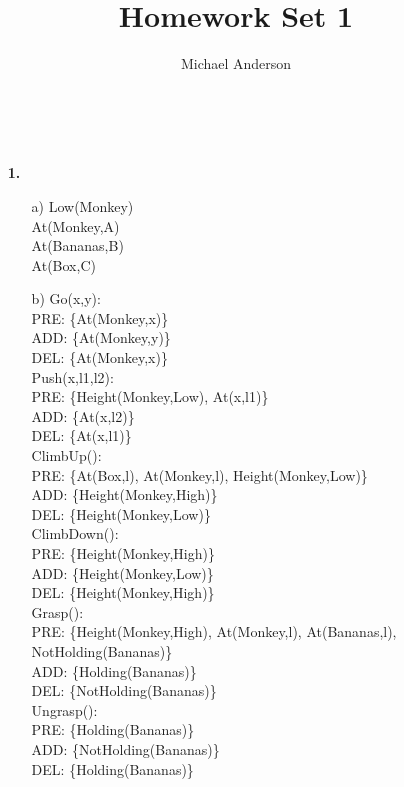 \documentclass{article}
\author{Michael Anderson}
\title{Homework Set 1}
\begin{document}
\maketitle
{}
\\
\flushleft
\newpage

\begin{enumerate}
\item[\textbf{1.}]

\begin{enumerate}
\item[a)]
Low(Monkey)\\
At(Monkey,A)\\
At(Bananas,B)\\
At(Box,C)\\

\item[b)]
Go(x,y):\\
PRE: \{At(Monkey,x)\}\\
ADD: \{At(Monkey,y)\}\\
DEL: \{At(Monkey,x)\}\\
\vspace{6pt}
Push(x,l1,l2):\\
PRE: \{Height(Monkey,Low), At(x,l1)\}\\
ADD: \{At(x,l2)\}\\
DEL: \{At(x,l1)\}\\
\vspace{6pt}
ClimbUp():\\
PRE: \{At(Box,l), At(Monkey,l), Height(Monkey,Low)\}\\
ADD: \{Height(Monkey,High)\}\\
DEL: \{Height(Monkey,Low)\}\\
\vspace{6pt}
ClimbDown():\\
PRE: \{Height(Monkey,High)\}\\
ADD: \{Height(Monkey,Low)\}\\
DEL: \{Height(Monkey,High)\}\\
\vspace{6pt}
Grasp():\\
PRE: \{Height(Monkey,High), At(Monkey,l), At(Bananas,l), NotHolding(Bananas)\}\\
ADD: \{Holding(Bananas)\}\\
DEL: \{NotHolding(Bananas)\}\\
\vspace{6pt}
Ungrasp():\\
PRE: \{Holding(Bananas)\}\\
ADD: \{NotHolding(Bananas)\}\\
DEL: \{Holding(Bananas)\}\\


\end{enumerate}
\end{enumerate}
\end{document}
